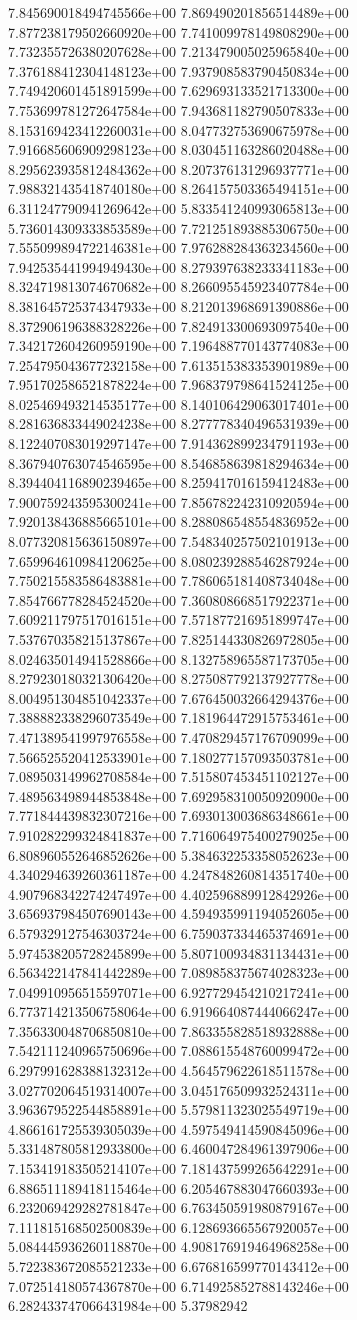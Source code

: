 	7.845690018494745566e+00	7.869490201856514489e+00	7.877238179502660920e+00	7.741009978149808290e+00	7.732355726380207628e+00	7.213479005025965840e+00	7.376188412304148123e+00	7.937908583790450834e+00	7.749420601451891599e+00	7.629693133521713300e+00	7.753699781272647584e+00	7.943681182790507833e+00	8.153169423412260031e+00	8.047732753690675978e+00	7.916685606909298123e+00	8.030451163286020488e+00	8.295623935812484362e+00	8.207376131296937771e+00	7.988321435418740180e+00	8.264157503365494151e+00	6.311247790941269642e+00	5.833541240993065813e+00	5.736014309333853589e+00	7.721251893885306750e+00	7.555099894722146381e+00	7.976288284363234560e+00	7.942535441994949430e+00	8.279397638233341183e+00	8.324719813074670682e+00	8.266095545923407784e+00	8.381645725374347933e+00	8.212013968691390886e+00	8.372906196388328226e+00	7.824913300693097540e+00	7.342172604260959190e+00	7.196488770143774083e+00	7.254795043677232158e+00	7.613515383353901989e+00	7.951702586521878224e+00	7.968379798641524125e+00	8.025469493214535177e+00	8.140106429063017401e+00	8.281636833449024238e+00	8.277778340496531939e+00	8.122407083019297147e+00	7.914362899234791193e+00	8.367940763074546595e+00	8.546858639818294634e+00	8.394404116890239465e+00	8.259417016159412483e+00	7.900759243595300241e+00	7.856782242310920594e+00	7.920138436885665101e+00	8.288086548554836952e+00	8.077320815636150897e+00	7.548340257502101913e+00	7.659964610984120625e+00	8.080239288546287924e+00	7.750215583586483881e+00	7.786065181408734048e+00	7.854766778284524520e+00	7.360808668517922371e+00	7.609211797517016151e+00	7.571877216951899747e+00	7.537670358215137867e+00	7.825144330826972805e+00	8.024635014941528866e+00	8.132758965587173705e+00	8.279230180321306420e+00	8.275087792137927778e+00	8.004951304851042337e+00	7.676450032664294376e+00	7.388882338296073549e+00	7.181964472915753461e+00	7.471389541997976558e+00	7.470829457176709099e+00	7.566525520412533901e+00	7.180277157093503781e+00	7.089503149962708584e+00	7.515807453451102127e+00	7.489563498944853848e+00	7.692958310050920900e+00	7.771844439832307216e+00	7.693013003686348661e+00	7.910282299324841837e+00	7.716064975400279025e+00	6.808960552646852626e+00	5.384632253358052623e+00	4.340294639260361187e+00	4.247848260814351740e+00	4.907968342274247497e+00	4.402596889912842926e+00	3.656937984507690143e+00	4.594935991194052605e+00	6.579329127546303724e+00	6.759037334465374691e+00	5.974538205728245899e+00	5.807100934831134431e+00	6.563422147841442289e+00	7.089858375674028323e+00	7.049910956515597071e+00	6.927729454210217241e+00	6.773714213506758064e+00	6.919664087444066247e+00	7.356330048706850810e+00	7.863355828518932888e+00	7.542111240965750696e+00	7.088615548760099472e+00	6.297991628388132312e+00	4.564579622618511578e+00	3.027702064519314007e+00	3.045176509932524311e+00	3.963679522544858891e+00	5.579811323025549719e+00	4.866161725539305039e+00	4.597549414590845096e+00	5.331487805812933800e+00	6.460047284961397906e+00	7.153419183505214107e+00	7.181437599265642291e+00	6.886511189418115464e+00	6.205467883047660393e+00	6.232069429282781847e+00	6.763450591980879167e+00	7.111815168502500839e+00	6.128693665567920057e+00	5.084445936260118870e+00	4.908176919464968258e+00	5.722383672085521233e+00	6.676816599770143412e+00	7.072514180574367870e+00	6.714925852788143246e+00	6.282433747066431984e+00	5.37982942